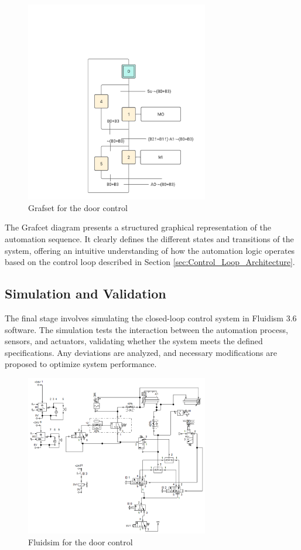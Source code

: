 \begin{figure}[H]
    \includegraphics[width=8cm]{Images/grafset.png}
    \centering
    \caption{Grafset for the door control}
    \label{fig:grafset}
\end{figure}

The Grafcet diagram presents a structured graphical representation of the automation sequence. It clearly defines 
the different states and transitions of the system, offering an intuitive 
understanding of how the automation logic operates based on the control loop described in Section \ref{sec:Control_Loop_Architecture}.

\subsection{Simulation and Validation} \label{sec:Simulation_and_Validation}

The final stage involves simulating the closed-loop control system in Fluidism 3.6 software. 
The simulation tests the interaction between the automation process, sensors, and actuators, 
validating whether the system meets the defined specifications. Any deviations are analyzed, 
and necessary modifications are proposed to optimize system performance.

\begin{figure}[H]
    \includegraphics[width=8cm]{Images/fluidsim.png}
    \centering
    \caption{Fluidsim for the door control}
    \label{fig:fluidsim}
\end{figure}


